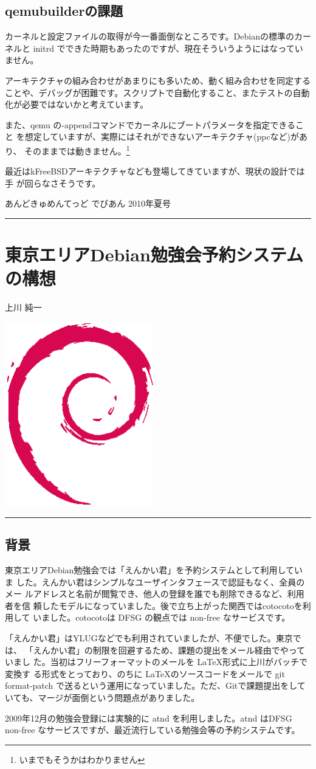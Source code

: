 \documentclass[mingoth,a4paper]{jsarticle}
\renewcommand{\dancersection}[2]{%
\newpage
あんどきゅめんてっど でびあん 2010年夏号
%
\vspace{0.1mm}\\
{\color{dancerlightblue}\rule{\hsize}{2mm}}

%
%
\begin{minipage}[t]{0.6\hsize}
\color{dancerdarkblue}
\vspace{1cm}
\section{#1}
\hfill{}#2\\
\end{minipage}
\begin{minipage}[t]{0.4\hsize}
\vspace{-2cm}
\hfill{}\includegraphics[height=8cm]{image200502/openlogo-nd.eps}\\
\vspace{-5cm}
\end{minipage}
%
%
{\color{dancerdarkblue}\rule{0.74\hsize}{2mm}}
%
\vspace{2cm}
}
\begin{document}
\subsection{qemubuilderの課題}

カーネルと設定ファイルの取得が今一番面倒なところです。Debianの標準のカー
ネルと initrd でできた時期もあったのですが、現在そういうようにはなってい
ません。

アーキテクチャの組み合わせがあまりにも多いため、動く組み合わせを同定する
ことや、デバッグが困難です。スクリプトで自動化すること、またテストの自動
化が必要ではないかと考えています。

また、qemu の-appendコマンドでカーネルにブートパラメータを指定できること
を想定していますが、実際にはそれができないアーキテクチャ(ppcなど)があり、
そのままでは動きません。\footnote{いまでもそうかはわかりません}

最近はkFreeBSDアーキテクチャなども登場してきていますが、現状の設計では手
が回らなさそうです。

\dancersection{東京エリアDebian勉強会予約システムの構想}{上川 純一}

\subsection{背景}

東京エリアDebian勉強会では「えんかい君」を予約システムとして利用していま
した。えんかい君はシンプルなユーザインタフェースで認証もなく、全員のメー
ルアドレスと名前が閲覧でき、他人の登録を誰でも削除できるなど、利用者を信
頼したモデルになっていました。後で立ち上がった関西ではcotocotoを利用して
いました。cotocotoは DFSG の観点では non-free なサービスです。

「えんかい君」はYLUGなどでも利用されていましたが、不便でした。東京では、
「えんかい君」の制限を回避するため、課題の提出をメール経由でやっていまし
た。当初はフリーフォーマットのメールを \LaTeX 形式に上川がバッチで変換す
る形式をとっており、のちに \LaTeX のソースコードをメールで git
format-patch で送るという運用になっていました。ただ、Gitで課題提出をして
いても、マージが面倒という問題点がありました。

2009年12月の勉強会登録には実験的に atnd を利用しました。atnd はDFSG
non-free なサービスですが、最近流行している勉強会等の予約システムです。
\end{document}
